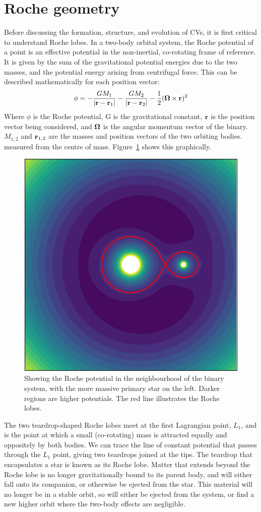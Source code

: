 \section{Roche geometry}
\label{sect:introduction:Roche geometry}

Before discussing the formation, structure, and evolution of CVs, it is first critical to understand Roche lobes.
In a two-body orbital system, the Roche potential of a point is an effective potential in the non-inertial, co-rotating frame of reference. It is given by the sum of the gravitational potential energies due to the two masses, and the potential energy arising from centrifugal force. This can be described mathematically for each position vector:
\begin{equation}
    {\bf \phi} = -\frac{G M_1}{|{\bf r - r}_1|} - \frac{G M_2}{|{\bf r - r}_2|} - \frac{1}{2}({\bf \Omega} \times {\bf r})^2
\end{equation}
Where $\phi$ is the Roche potential, G is the gravitational constant, $\bf r$ is the position vector being considered, and $\bf \Omega$ is the angular momentum vector of the binary. $M_{1,2}$ and ${\bf r}_{1,2}$ are the masses and position vectors of the two orbiting bodies. measured from the centre of mass. Figure~\ref{fig:roche} shows this graphically. 

\begin{figure}
    \centering
    \includegraphics[width=.6\columnwidth]{figures/introduction/roche.png}
    \caption{Showing the Roche potential in the neighbourhood of the binary system, with the more massive primary star on the left. Darker regions are higher potentials. The red line illustrates the Roche lobes.}
    \label{fig:roche}
\end{figure}

The two teardrop-shaped Roche lobes meet at the first Lagrangian point, $L_1$, and is the point at which a small (co-rotating) mass is attracted equally and oppositely by both bodies. We can trace the line of constant potential that passes through the $L_1$ point, giving two teardrops joined at the tips. The teardrop that encapsulates a star is known as its Roche lobe. Matter that extends beyond the Roche lobe is no longer gravitationally bound to its parent body, and will either fall onto its companion, or otherwise be ejected from the star. This material will no longer be in a stable orbit, so will either be ejected from the system, or find a new higher orbit where the two-body effects are negligible.

